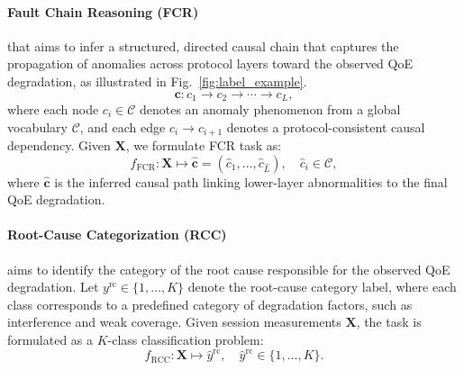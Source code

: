 \documentclass[sigconf,10pt]{acmart} %
\begin{document}
\paragraph{Fault Chain Reasoning (FCR) } that aims to infer a structured, directed causal chain that captures the propagation of anomalies across protocol layers toward the observed QoE degradation, as illustrated in Fig.~\ref{fig:label_example}.
\begin{equation}
  \mathbf{c}: c_1 \rightarrow c_2 \rightarrow \cdots \rightarrow c_L,
\end{equation}
where each node $c_i \in \mathcal{C}$ denotes an anomaly phenomenon from a global vocabulary $\mathcal{C}$, and each edge $c_i \rightarrow c_{i+1}$ denotes a protocol-consistent causal dependency. Given $\mathbf{X}$, we formulate FCR task as:
\begin{equation}
  f_{\text{FCR}}: \mathbf{X} \mapsto \hat{\mathbf{c}} = (\hat{c}_1,\ldots,\hat{c}_{\hat{L}}), \quad \hat{c}_i \in \mathcal{C},
\end{equation}
where $\hat{\mathbf{c}}$ is the inferred causal path linking lower-layer abnormalities to the final QoE degradation.

\paragraph{Root-Cause Categorization (RCC)} aims to identify the category of the root cause responsible for the observed QoE degradation. 
Let $y^{\mathrm{rc}} \in \{1,\ldots,K\}$ denote the root-cause category label, where each class corresponds to a predefined category of degradation factors, such as interference and weak coverage. Given session measurements $\mathbf{X}$, the task is formulated as a $K$-class classification problem:
\begin{equation}
  f_{\text{RCC}}: \mathbf{X} \mapsto \hat{y}^{\mathrm{rc}}, \quad \hat{y}^{\mathrm{rc}} \in \{1,\ldots,K\}.
\end{equation}


\end{document}

